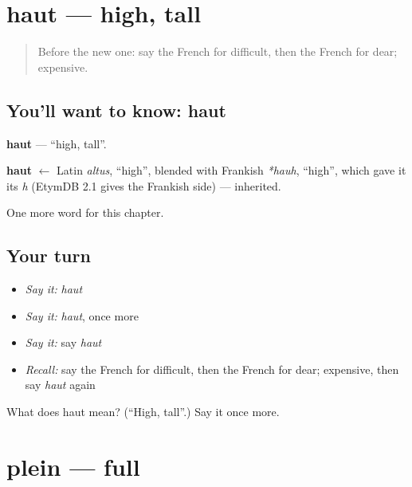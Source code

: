 \section[haut]{haut — high, tall}

\label{lesson:FR-C90-haut}



\begin{quote}
Before the new one: say the French for difficult, then the French for dear; expensive.
\end{quote}

\subsection*{You'll want to know: haut}
\textbf{haut} — \textquotedblleft{}high, tall\textquotedblright{}.

\begin{cousinweb}
\textbf{haut} $\leftarrow$ Latin \emph{altus}, \textquotedblleft{}high\textquotedblright{}, blended with Frankish \emph{*hauh}, \textquotedblleft{}high\textquotedblright{}, which gave it its \emph{h} (EtymDB 2.1 gives the Frankish side) — inherited.
\end{cousinweb}

\begin{grammarlens}[title={What you've built}]
One more word for this chapter.
\end{grammarlens}

\subsection*{Your turn}
\begin{itemize}
\raggedright
  \item \emph{Say it:} \emph{haut}
  \item \emph{Say it:} \emph{haut}, once more
  \item \emph{Say it:} say \emph{haut}
  \item \emph{Recall:} say the French for difficult, then the French for dear; expensive, then say \emph{haut} again
\end{itemize}

\begin{tcolorbox}[breakable,colback=teal!4,colframe=teal!35!black,title={Before you move on}]
What does haut mean? (\textquotedblleft{}High, tall\textquotedblright{}.) Say it once more.
\end{tcolorbox}
\section[plein]{plein — full}

